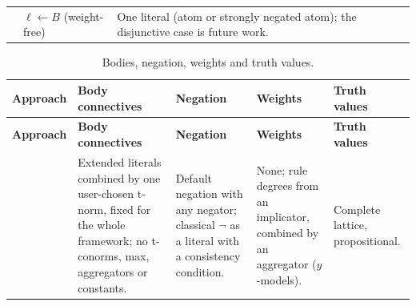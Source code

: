{\begin{longtable}{@{}p{}p{}p{}@{}}
            \cite{KettmannSHS26arxiv}             & $\ell\leftarrow B$ (weight-free)                                                                                                                        & One literal (atom or strongly negated atom); the disjunctive case is future work.                                                                                                                                                   \\
        \end{longtable}

        \begin{longtable}{@{}p{}p{}p{}p{}p{}@{}}
            \caption{Bodies, negation, weights and truth values.}\label{tab:syntax-bodies}                                                                                                                                                                                                                                                                                                                                                                                       \\
            \toprule
            \textbf{Approach}                                & \textbf{Body connectives}                                                                                                                          & \textbf{Negation}                                                                                  & \textbf{Weights}                                                                                & \textbf{Truth values}                                 \\
            \midrule\endfirsthead
            \toprule
            \textbf{Approach}                                & \textbf{Body connectives}                                                                                                                          & \textbf{Negation}                                                                                  & \textbf{Weights}                                                                                & \textbf{Truth values}                                 \\
            \midrule\endhead
            \bottomrule\endfoot
            \cite{VanNieuwenborghDV06,VanNieuwenborghDV07}   & Extended literals combined by one user-chosen t-norm, fixed for the whole framework; no t-conorms, max, aggregators or constants.                  & Default negation with any negator; classical $\neg$ as a literal with a consistency condition.     & None; rule degrees from an implicator, combined by an aggregator ($y$-models).                  & Complete lattice, propositional.                      \\

\end{longtable}}
